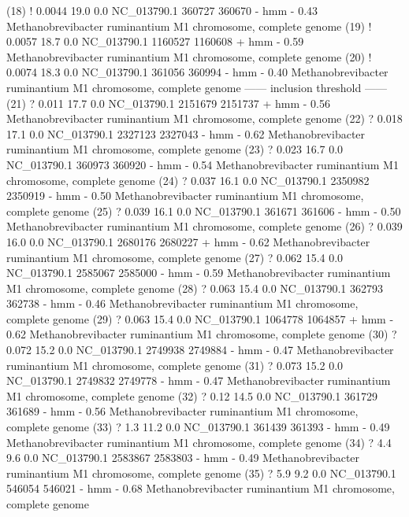 \begin{sreoutput}
 (18) !    0.0044   19.0   0.0  NC_013790.1  360727  360670 - hmm     - 0.43  Methanobrevibacter ruminantium M1 chromosome, complete genome
 (19) !    0.0057   18.7   0.0  NC_013790.1 1160527 1160608 + hmm     - 0.59  Methanobrevibacter ruminantium M1 chromosome, complete genome
 (20) !    0.0074   18.3   0.0  NC_013790.1  361056  360994 - hmm     - 0.40  Methanobrevibacter ruminantium M1 chromosome, complete genome
 ------ inclusion threshold ------
 (21) ?     0.011   17.7   0.0  NC_013790.1 2151679 2151737 + hmm     - 0.56  Methanobrevibacter ruminantium M1 chromosome, complete genome
 (22) ?     0.018   17.1   0.0  NC_013790.1 2327123 2327043 - hmm     - 0.62  Methanobrevibacter ruminantium M1 chromosome, complete genome
 (23) ?     0.023   16.7   0.0  NC_013790.1  360973  360920 - hmm     - 0.54  Methanobrevibacter ruminantium M1 chromosome, complete genome
 (24) ?     0.037   16.1   0.0  NC_013790.1 2350982 2350919 - hmm     - 0.50  Methanobrevibacter ruminantium M1 chromosome, complete genome
 (25) ?     0.039   16.1   0.0  NC_013790.1  361671  361606 - hmm     - 0.50  Methanobrevibacter ruminantium M1 chromosome, complete genome
 (26) ?     0.039   16.0   0.0  NC_013790.1 2680176 2680227 + hmm     - 0.62  Methanobrevibacter ruminantium M1 chromosome, complete genome
 (27) ?     0.062   15.4   0.0  NC_013790.1 2585067 2585000 - hmm     - 0.59  Methanobrevibacter ruminantium M1 chromosome, complete genome
 (28) ?     0.063   15.4   0.0  NC_013790.1  362793  362738 - hmm     - 0.46  Methanobrevibacter ruminantium M1 chromosome, complete genome
 (29) ?     0.063   15.4   0.0  NC_013790.1 1064778 1064857 + hmm     - 0.62  Methanobrevibacter ruminantium M1 chromosome, complete genome
 (30) ?     0.072   15.2   0.0  NC_013790.1 2749938 2749884 - hmm     - 0.47  Methanobrevibacter ruminantium M1 chromosome, complete genome
 (31) ?     0.073   15.2   0.0  NC_013790.1 2749832 2749778 - hmm     - 0.47  Methanobrevibacter ruminantium M1 chromosome, complete genome
 (32) ?      0.12   14.5   0.0  NC_013790.1  361729  361689 - hmm     - 0.56  Methanobrevibacter ruminantium M1 chromosome, complete genome
 (33) ?       1.3   11.2   0.0  NC_013790.1  361439  361393 - hmm     - 0.49  Methanobrevibacter ruminantium M1 chromosome, complete genome
 (34) ?       4.4    9.6   0.0  NC_013790.1 2583867 2583803 - hmm     - 0.49  Methanobrevibacter ruminantium M1 chromosome, complete genome
 (35) ?       5.9    9.2   0.0  NC_013790.1  546054  546021 - hmm     - 0.68  Methanobrevibacter ruminantium M1 chromosome, complete genome
\end{sreoutput}


